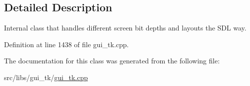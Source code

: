 \subsection{Detailed Description}
Internal class that handles different screen bit depths and layouts the S\-D\-L way. 

Definition at line 1438 of file gui\-\_\-tk.\-cpp.



The documentation for this class was generated from the following file\-:\begin{DoxyCompactItemize}
\item 
src/libs/gui\-\_\-tk/\hyperlink{gui__tk_8cpp}{gui\-\_\-tk.\-cpp}\end{DoxyCompactItemize}
